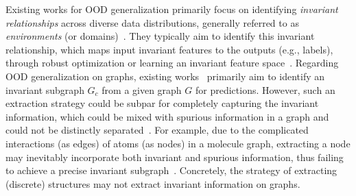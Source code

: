 Existing works for OOD generalization primarily focus on identifying \textit{invariant relationships} across diverse data distributions, generally referred to as \textit{environments} (or domains)~\citep{arjovsky2019invariant,chang2020invariant,ahuja2020invariant}. They typically
aim to identify this invariant relationship, which maps input invariant features to the outputs (e.g., labels), through robust optimization or learning an invariant feature space~\citep{creager2021environment,krueger2021out}. Regarding OOD generalization on graphs, existing works~\citep{chen2022learning,miao2022interpretable,chen2023does,tan2023virtual,wang2024enhancing} primarily aim to identify an invariant subgraph $G_c$ from a given graph $G$ for predictions. 
However, such an extraction strategy could be subpar for completely capturing the invariant information, which could be mixed with spurious information in a graph and could not be distinctly separated~\citep{bevilacqua2021size}. 
For example, due to the complicated interactions (as edges) of atoms (as nodes) in a molecule graph, extracting a node may inevitably incorporate both invariant and spurious information, thus failing to achieve a precise invariant subgraph~\citep{gui2022good}.
Concretely, the strategy of extracting (discrete) structures may not extract invariant information on graphs. 

